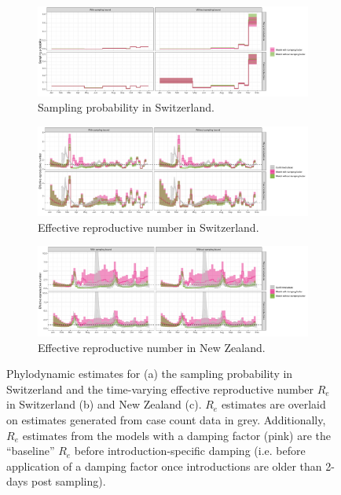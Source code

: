 \documentclass[9pt,twoside,lineno]{pnas-new}
\begin{document}
\begin{figure}[h!]
\centering
\begin{subfigure}[b]{\textwidth}
\includegraphics[width=\linewidth]{figures/CHE_sampProp.pdf}
\caption{Sampling probability in Switzerland.}
\end{subfigure}
\begin{subfigure}[b]{\textwidth}
\includegraphics[width=\linewidth]{figures/CHE_Re.pdf}
\caption{Effective reproductive number in Switzerland.}
\end{subfigure}
\begin{subfigure}[b]{\textwidth}
\includegraphics[width=\linewidth]{figures/NZL_Re.pdf}
\caption{Effective reproductive number in New Zealand.}
\end{subfigure}
\caption{Phylodynamic estimates for  (a) the sampling probability in Switzerland and the time-varying effective reproductive number $R_e$ in Switzerland (b) and New Zealand (c). $R_e$ estimates are overlaid on estimates generated from case count data \cite{huisman_re_preprint} in grey. Additionally, $R_e$ estimates from the models with a damping factor (pink) are the ``baseline'' $R_e$ before introduction-specific damping (i.e. before application of a damping factor once introductions are older than 2-days post sampling).}  
\label{fig:ReSampProbResults}
\end{figure}
\end{document}
